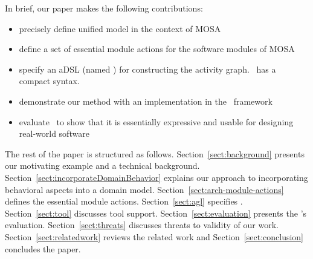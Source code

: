 In brief, our paper makes the following contributions:
%
\begin{itemize}[leftmargin=*]
	\item precisely define unified model in the context of MOSA
	\item define a set of essential module actions for the software modules of MOSA
	\item specify an aDSL (named \agl) for constructing the activity graph. \agl~has a compact syntax.
	\item demonstrate our method with an implementation in the \jdomainapp~framework 
  \item evaluate \agl~to show that it is essentially expressive and usable for designing real-world software
\end{itemize}

The rest of the paper is structured as follows. Section~\ref{sect:background} presents our motivating example and a technical background. 
Section~\ref{sect:incorporateDomainBehavior} explains our approach to incorporating behavioral aspects into a domain model. 
Section~\ref{sect:arch-module-actions} defines the essential module actions. 
Section~\ref{sect:agl} specifies \agl. 
Section~\ref{sect:tool} discusses tool support.
Section~\ref{sect:evaluation} presents the \agl's evaluation. 
Section~\ref{sect:threats} discusses threats to validity of our work.
Section~\ref{sect:relatedwork} reviews the related work and 
Section~\ref{sect:conclusion} concludes the paper.